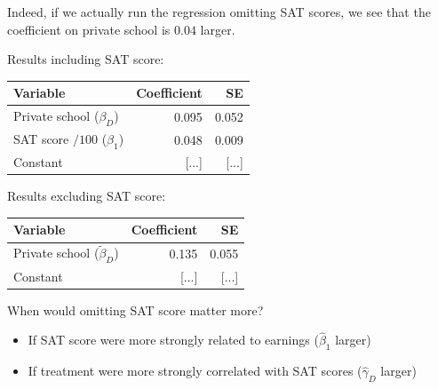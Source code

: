 \documentclass[11pt,english,handout]{beamer}
\newenvironment{wideitemize}{\itemize\addtolength{\itemsep}{10pt}}{\enditemize}
\begin{document}
\begin{frame}
	\begin{wideitemize}
		\item
		Indeed, if we actually run the regression omitting SAT scores, we see that the coefficient on private school is $0.04$ larger.
		
		\item
		Results including SAT score:
		
		\begin{tabular}{lrr}
			Variable & Coefficient & SE \\ \hline
			Private school ($\beta_D$) & 0.095 & 0.052 \\
			SAT score $/ 100$ ($\beta_1$) & 0.048 & 0.009 \\
			Constant & [...] & [...]
		\end{tabular}
		
		
		\item
		Results excluding SAT score:
		\begin{tabular}{lrr}
			Variable & Coefficient & SE \\ \hline
			Private school ($\tilde\beta_D$) & 0.135 & 0.055 \\
			Constant & [...] & [...]
		\end{tabular}
		
		\pause
		\item
		When would omitting SAT score matter more? \pause
		\begin{itemize}
			\item 
			If SAT score were more strongly related to earnings ($\hat\beta_1$ larger)
			
			\pause
			\item
			If treatment were more strongly correlated with SAT scores ($\hat\gamma_D$ larger)
		\end{itemize}
		
	\end{wideitemize}
\end{frame}
\end{document}
